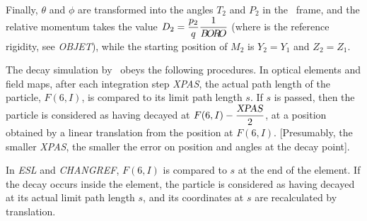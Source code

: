 \noindent Finally, $\theta$ and $\phi$ are transformed into the angles $ T_2 $
and $ P_2 $ in the \zgou\ frame, and the relative momentum takes the value 
$ D_2= \dfrac{p_2 }{ q} \dfrac{1}{B\!O\!R\!O} $ (where \BORO   
is the reference rigidity, see \textsl{OBJET}), while the starting position of 
$M_2 $ is $ Y_2=Y_1 $ and $ Z_2=Z_1 $.   
\bigskip

\noindent The decay simulation by \zgou\ obeys the following procedures.
In optical elements and field maps, after each integration step \textsl{XPAS}, the actual 
path length of the particle, $ F(6,I) $, is compared to its limit path length $ s$. 
 If $s $ is passed, then the particle is considered as having decayed at 
 $ F(6,I) - \dfrac{\text{\textsl{XPAS}} }{ 2} $, 
at a position obtained by a linear translation from the position at $ F(6,I)$.
[Presumably, the smaller \textsl{XPAS},  the smaller the error on position
and angles at the decay point].  
\bigskip
\begin{figure}[H]
{\setlength{\captionwidth}{15cm}
       }
\end{figure}

\noindent In   \textsl{ESL}   and  \textsl{CHANGREF},  
$ F(6,I) $ is compared to $ s $ at the
end of the element. If the decay occurs inside the element, the particle is considered as having 
decayed at its actual limit path length $ s$,  and its coordinates 
at $ s $ are recalculated by translation.  
\bigskip

